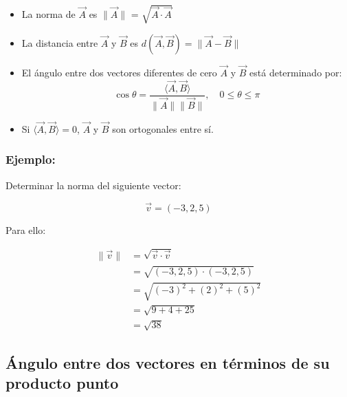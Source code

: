 \documentclass{article}
\begin{document}
        \begin{itemize}

            \item La norma de $\vec{A}$ es $\parallel \vec{A}\parallel$ = $\sqrt{\vec{A} \cdot \vec{A}}$
            \item La distancia entre $\vec{A}$ y $\vec{B}$ es $d(\vec{A}, \vec{B}) = \parallel \vec{A} - \vec{B} \parallel$
            \item El ángulo entre dos vectores diferentes de cero $\vec{A}$ y $\vec{B}$ está determinado por: \\
            \begin{equation}
                \cos \theta=\frac{\langle\vec{A}, \vec{B}\rangle}{\parallel\vec{A}\parallel\parallel\vec{B}\parallel}, \quad 0 \leq \theta \leq \pi
            \end{equation}
            \item Si $\langle \vec{A}, \vec{B}\rangle = 0$, $\vec{A}$ y $\vec{B}$ son ortogonales entre sí.

        \end{itemize}

        \subsubsection*{Ejemplo:}

        Determinar la norma del siguiente vector:

        \begin{equation*}
            \vec{v}=(-3,2,5)
        \end{equation*}

        Para ello:

        \begin{equation*}
            \begin{aligned}
            \parallel \vec{v}\parallel &=\sqrt{\vec{v} \cdot \vec{v}} \\
            &=\sqrt{(-3,2,5) \cdot(-3,2,5)} \\
            &=\sqrt{(-3)^{2}+(2)^{2}+(5)^{2}} \\
            &=\sqrt{9+4+25} \\
            &=\sqrt{38}
            \end{aligned}
        \end{equation*}

    \subsection{Ángulo entre dos vectores en términos de su producto punto}
\end{document}
